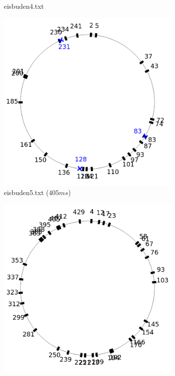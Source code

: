 \documentclass[a4paper,10pt,ngerman,captions=figureheading]{scrartcl}
\newcommand{\imageWidth}{0.3\linewidth}
\begin{document}
\begin{figure}[ht]
\begin{subfigure}[t]{\imageWidth}
        \caption{eisbuden4.txt}
        \label{fig:eisbuden4}
    \end{subfigure}
    \begin{subfigure}[t]{\imageWidth}
        \includegraphics[width=\linewidth]{eisbuden5.png}
        \caption{eisbuden5.txt ($405ms$)}
        \label{fig:eisbuden5}
    \end{subfigure}
    \begin{subfigure}[t]{\imageWidth}
        \includegraphics[width=\linewidth]{eisbuden6.png}

\end{subfigure}
\end{figure}
\end{document}
